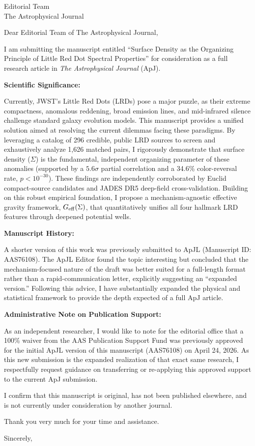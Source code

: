 \documentclass[11pt]{letter}
\date{\today}
\begin{document}
\begin{letter}{Editorial Team\\The Astrophysical Journal}

\opening{Dear Editorial Team of The Astrophysical Journal,}

I am submitting the manuscript entitled ``Surface Density as the Organizing Principle of Little Red Dot Spectral Properties'' for consideration as a full research article in \emph{The Astrophysical Journal} (ApJ).

\textbf{Scientific Significance:}

Currently, JWST's Little Red Dots (LRDs) pose a major puzzle, as their extreme compactness, anomalous reddening, broad emission lines, and mid-infrared silence challenge standard galaxy evolution models. This manuscript provides a unified solution aimed at resolving the current dilemmas facing these paradigms. By leveraging a catalog of 296 credible, public LRD sources to screen and exhaustively analyze 1,626 matched pairs, I rigorously demonstrate that surface density ($\Sigma$) is the fundamental, independent organizing parameter of these anomalies (supported by a $5.6\sigma$ partial correlation and a 34.6\% color-reversal rate, $p < 10^{-30}$). These findings are independently corroborated by Euclid compact-source candidates and JADES DR5 deep-field cross-validation. Building on this robust empirical foundation, I propose a mechanism-agnostic effective gravity framework, $G_{\rm eff}(\Sigma)$, that quantitatively unifies all four hallmark LRD features through deepened potential wells.

\textbf{Manuscript History:}

A shorter version of this work was previously submitted to ApJL (Manuscript ID: AAS76108). The ApJL Editor found the topic interesting but concluded that the mechanism-focused nature of the draft was better suited for a full-length format rather than a rapid-communication letter, explicitly suggesting an ``expanded version.'' Following this advice, I have substantially expanded the physical and statistical framework to provide the depth expected of a full ApJ article.

\textbf{Administrative Note on Publication Support:}

As an independent researcher, I would like to note for the editorial office that a 100\% waiver from the AAS Publication Support Fund was previously approved for the initial ApJL version of this manuscript (AAS76108) on April 24, 2026. As this new submission is the expanded realization of that exact same research, I respectfully request guidance on transferring or re-applying this approved support to the current ApJ submission.

I confirm that this manuscript is original, has not been published elsewhere, and is not currently under consideration by another journal.

Thank you very much for your time and assistance.

\closing{Sincerely,}

\end{letter}
\end{document}
